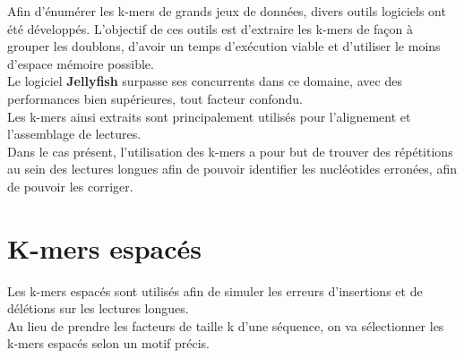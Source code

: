 \documentclass{report}
\begin{document}
      Afin d'énumérer les k-mers de grands jeux de données, divers outils logiciels ont été développés. L'objectif de ces outils est d'extraire les k-mers de façon à grouper les doublons, d'avoir un temps d'exécution viable et d'utiliser le moins d'espace mémoire possible.\\

      Le logiciel \textbf{Jellyfish} \cite{Marcais2011} surpasse ses concurrents dans ce domaine, avec des performances bien supérieures, tout facteur confondu.\\

      Les k-mers ainsi extraits sont principalement utilisés pour l'alignement et l'assemblage de lectures.\\

      Dans le cas présent, l'utilisation des k-mers a pour but de trouver des répétitions au sein des lectures longues afin de pouvoir identifier les nucléotides erronées, afin de pouvoir les corriger.
    \section{K-mers espacés}
      Les k-mers espacés sont utilisés afin de simuler les erreurs d'insertions et de délétions sur les lectures longues.\\
      Au lieu de prendre les facteurs de taille k d'une séquence, on va sélectionner les k-mers espacés selon un motif précis.\\
\end{document}
